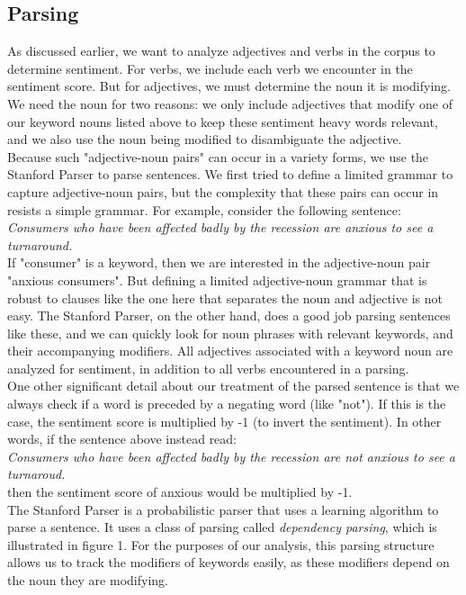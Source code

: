 \documentclass[pageno]{jpaper}
\begin{document}
\subsection{Parsing}
As discussed earlier, we want to analyze adjectives and verbs in the corpus to determine sentiment. For verbs, we include each verb we encounter in the sentiment score. But for adjectives, we must determine the noun it is modifying. We need the noun for two reasons: we only include adjectives that modify one of our keyword nouns listed above to keep these sentiment heavy words relevant, and we also use the noun being modified to disambiguate the adjective. \\
\indent Because such "adjective-noun pairs" can occur in a variety forms, we use the Stanford Parser to parse sentences. We first tried to define a limited grammar to capture adjective-noun pairs, but the complexity that these pairs can occur in resists a simple grammar. For example, consider the following sentence: \\
\textit{Consumers who have been affected badly by the recession are anxious to see a turnaround.} \\
If "consumer" is a keyword, then we are interested in the adjective-noun pair "anxious consumers". But defining a limited adjective-noun grammar that is robust to clauses like the one here that separates the noun and adjective is not easy. The Stanford Parser, on the other hand, does a good job parsing sentences like these, and we can quickly look for noun phrases with relevant keywords, and their accompanying modifiers. All adjectives associated with a keyword noun are analyzed for sentiment, in addition to all verbs encountered in a parsing.\\
\indent One other significant detail about our treatment of the parsed sentence is that we always check if a word is preceded by a negating word (like "not"). If this is the case, the sentiment score is multiplied by -1 (to invert the sentiment). In other words, if the sentence above instead read: \\
\textit{Consumers who have been affected badly by the recession are not anxious to see a turnaroud.} \\
then the sentiment score of anxious would be multiplied by -1. \\
\indent The Stanford Parser is a probabilistic parser that uses a learning algorithm to parse a sentence. It uses a class of parsing called \textit{dependency parsing}, which is illustrated in figure 1. For the purposes of our analysis, this parsing structure allows us to track the modifiers of keywords easily, as these modifiers depend on the noun they are modifying. \\
\end{document}
